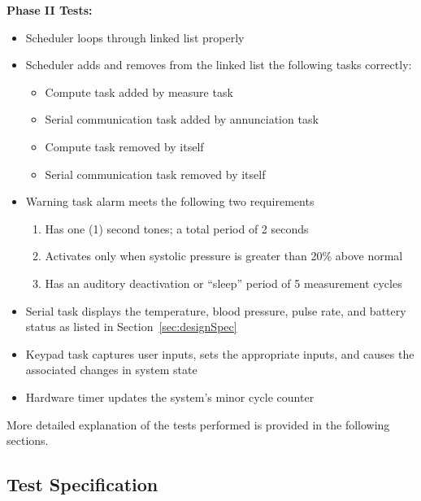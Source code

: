 \documentclass[12pt]{article} %
\begin{document}
    \textbf{Phase II Tests:}
    \begin{itemize}
      \item Scheduler loops through linked list properly
      \item Scheduler adds and removes from the linked list the following tasks
	correctly:
	\begin{itemize}
	  \item Compute task added by measure task
	  \item Serial communication task added by annunciation task
	  \item Compute task removed by itself
	  \item Serial communication task removed by itself
	\end{itemize}
      \item Warning task alarm meets the following two requirements
	\begin{enumerate}
	  \item Has one (1) second tones; a total period of 2 seconds
	  \item Activates only when systolic pressure is greater than 20\% above
	    normal
	  \item Has an auditory deactivation or ``sleep'' period of 5
	    measurement cycles
	\end{enumerate}
	\item Serial task displays the temperature, blood pressure, pulse rate,
	  and battery status as listed in Section~\ref{sec:designSpec}
	\item Keypad task captures user inputs, sets the appropriate inputs,
	  and causes the associated changes in system state
	\item Hardware timer updates the system's minor cycle counter
    \end{itemize}

    More detailed explanation of the tests performed is provided in the
    following sections.
    
    \subsection{Test Specification} 

%
\end{document}

